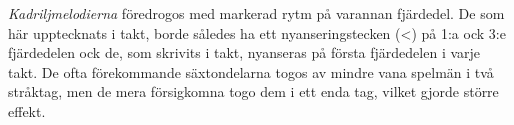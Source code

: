\thispagestyle{empty}
\vspace*{5cm}
\begin{adjustwidth*}{30mm}{30mm}
\setlength{\parindent}{0em}

\textit{Kadriljmelodierna} föredrogos med markerad rytm på
varannan fjärdedel. De som här upptecknats i  takt, borde
således ha ett nyanseringstecken (<) på 1:a ock 3:e fjärdedelen
ock de, som skrivits i  takt, nyanseras på första
fjärdedelen i varje takt. De ofta förekommande säxtondelarna
togos av mindre vana spelmän i två \guillemotright{}stråktag\guillemotright{}, men de mera
försigkomna togo dem i ett enda \guillemotright{}tag\guillemotright{}, vilket gjorde större
\guillemotright{}effekt\guillemotright{}.

\end{adjustwidth*}

